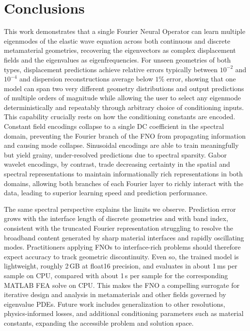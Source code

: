 \documentclass[preprint,review,12pt,numafflabel]{elsarticle}
\begin{document}
\section{Conclusions}
\label{sec:Conclusion}
This work demonstrates that a single Fourier Neural Operator can learn multiple eigenmodes of the elastic wave equation across both continuous and discrete metamaterial geometries, recovering the eigenvectors as complex displacement fields and the eigenvalues as eigenfrequencies. For unseen geometries of both types, displacement predictions achieve relative errors typically between $10^{-2}$ and $10^{-4}$ and dispersion reconstructions average below $1\%$ error, showing that one model can span two very different geometry distributions and output predictions of multiple orders of magnitude while allowing the user to select any eigenmode deterministically and repeatably through arbitrary choice of conditioning inputs. This capability crucially rests on how the conditioning constants are encoded. Constant field encodings collapse to a single DC coefficient in the spectral domain, preventing the Fourier branch of the FNO from propagating information and causing mode collapse. Sinusoidal encodings are able to train meaningfully but yield grainy, under-resolved predictions due to spectral sparsity. Gabor wavelet encodings, by contrast, trade decreasing certainty in the spatial and spectral representations to maintain informationally rich representations in both domains, allowing both branches of each Fourier layer to richly interact with the data, leading to superior learning speed and prediction performance.

The same spectral perspective explains the limits we observe. Prediction error grows with the interface length of discrete geometries and with band index, consistent with the truncated Fourier representation struggling to resolve the broadband content generated by sharp material interfaces and rapidly oscillating modes. Practitioners applying FNOs to interface-rich problems should therefore expect accuracy to track geometric discontinuity. Even so, the trained model is lightweight, roughly 2\,GB at float16 precision, and evaluates in about 1\,ms per sample on CPU, compared with about 1\,s per sample for the corresponding MATLAB FEA solve on CPU. This makes the FNO a compelling surrogate for iterative design and analysis in metamaterials and other fields governed by eigenvalue PDEs. Future work includes generalization to other resolutions, physics-informed losses, and additional conditioning parameters such as material constants, expanding the accessible problem and solution space.
\end{document}
